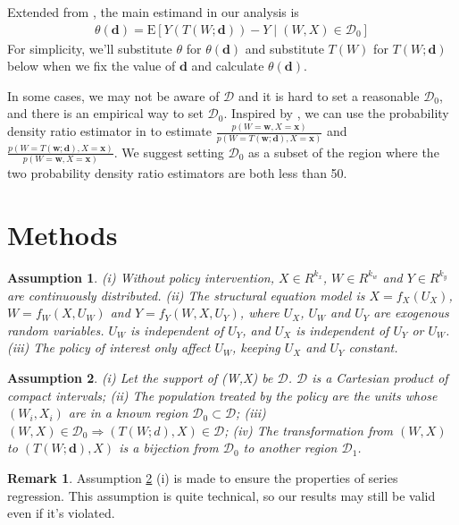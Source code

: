 \documentclass[11pt]{article}
\def\E{{\mathrm E}}
\numberwithin{equation}{section}
\newtheorem{assumption}{Assumption}[section]
\theoremstyle{definition}
\newtheorem{remark}{Remark}[section]
\begin{document}
Extended from \cite{munoz2012population}, the main estimand in our analysis is
\begin{align}
    \theta(\mathbf{d})=\E[Y(T(W;\mathbf{d}))-Y\mid (W,X)\in \mathcal{D}_0] 
\end{align}
For simplicity, we'll substitute $\theta$ for $\theta(\mathbf{d})$ and substitute $T(W)$ for $T(W;\mathbf{d})$ below when we fix the value of $\mathbf{d}$ and calculate $\theta(\mathbf{d})$.

In some cases, we may not be aware of $\mathcal{D}$ and it is hard to set a reasonable $\mathcal{D}_0$, and there is an empirical way to set $\mathcal{D}_0$. Inspired by \cite{mccoy2023semi}, we can use the probability density ratio estimator in \cite{lin2023estimation} to estimate $\frac{p(W=\mathbf{w},X=\mathbf{x})}{p(W=T(\mathbf{w};\mathbf{d}),X=\mathbf{x})}$ and $\frac{p(W=T(\mathbf{w};\mathbf{d}),X=\mathbf{x})}{p(W=\mathbf{w},X=\mathbf{x})}$. We suggest setting $\mathcal{D}_0$ as a subset of the region where the two probability density ratio estimators are both less than 50.

\section{Methods}\label{sec:setup}
\begin{assumption}\label{ass:1}
(i) Without policy intervention, $X \in R^{k_x}$, $W \in R^{k_w}$ and $Y \in R^{k_y}$ are continuously distributed. (ii) The structural equation model is $X = f_X(U_X)$, $W = f_W(X, U_W)$ and $Y = f_Y (W, X, U_Y )$, where  $U_{X}$, $U_{W}$ and  $U_{Y}$  are exogenous random variables. $U_{W}$ is independent of $ U_{Y}$, and $U_{X}$ is independent of $ U_{Y}$ or $U_{W}$. (iii) The policy of interest only affect $U_{W}$, keeping $U_{X}$ and $ U_{Y}$ constant.
\end{assumption}

\begin{assumption}\label{ass:2}
(i) Let the support of (W,X) be $\mathcal{D}$. $\mathcal{D}$ is a Cartesian product of compact intervals; (ii) The population treated by the policy are the units whose $(W_i,X_i)$ are in a known region $\mathcal{D}_0\subset\mathcal{D}$; (iii) $(W,X) \in \mathcal{D}_0\Rightarrow (T(W;d),X)\in \mathcal{D}$; (iv) The transformation from $(W,X)$ to $(T(W;\mathbf{d}),X)$ is a bijection from $\mathcal{D}_0$ to another region $\mathcal{D}_1$.
\end{assumption}

\begin{remark} Assumption \ref{ass:2} (i) is made to ensure the properties of series regression. This assumption is quite technical, so our results may still be valid even if it's violated.
\end{remark}
\end{document}
